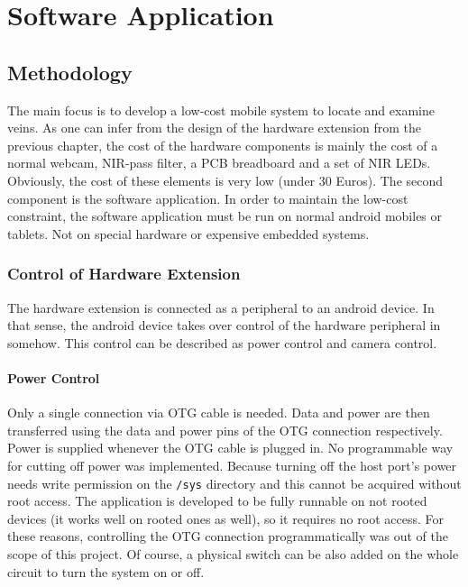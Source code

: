 
\chapter{Software Application}\label{Software Application}

\section{Methodology}
The main focus is to develop a low-cost mobile system to locate and examine veins. As one can infer from the design of the hardware extension from the previous chapter, the cost of the hardware components is mainly the cost of a normal webcam, NIR-pass filter, a PCB breadboard and a set of NIR LEDs. Obviously, the cost of these elements is very low (under 30 Euros). The second component is the software application. In order to maintain the low-cost constraint, the software application must be run on normal android mobiles or tablets. Not on special hardware or expensive embedded systems.

\subsection{Control of Hardware Extension}

The hardware extension is connected as a peripheral to an android device. In that sense, the android device takes over control of the hardware peripheral in somehow. This control can be described as power control and camera control.

\subsubsection{Power Control}
Only a single connection via OTG cable is needed. Data and power are then transferred using the data and power pins of the OTG connection respectively. Power is supplied whenever the OTG cable is plugged in. No programmable way for cutting off power was implemented. Because turning off the host port’s power needs write permission on the \texttt{/sys} directory and this cannot be acquired without root access. The application is developed to be fully runnable on not rooted devices (it works well on rooted ones as well), so it requires no root access. For these reasons, controlling the OTG connection programmatically was out of the scope of this project. Of course, a physical switch can be also added on the whole circuit to turn the system on or off. 

